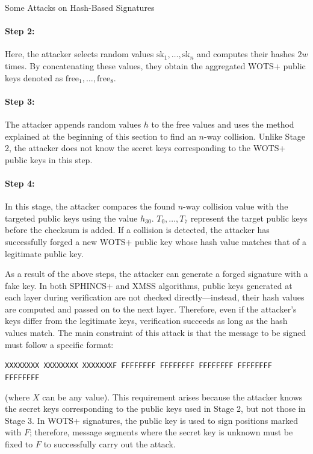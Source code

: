 \documentclass[version=preprint]{iacrcc}
\begin{document}
\begin{section}{Some Attacks on Hash-Based Signatures}
\paragraph{Step 2:}
Here, the attacker selects random values \( \text{sk}_1, \ldots, \text{sk}_n \) and computes their hashes \( 2w \) times. By concatenating these values, they obtain the aggregated WOTS+ public keys denoted as \( \text{free}_1, \ldots, \text{free}_8 \).

\paragraph{Step 3:}
The attacker appends random values \( h \) to the free values and uses the method explained at the beginning of this section to find an \( n \)-way collision. Unlike Stage 2, the attacker does not know the secret keys corresponding to the WOTS+ public keys in this step.

\paragraph{Step 4:}
In this stage, the attacker compares the found \( n \)-way collision value with the targeted public keys using the value \( h_{30} \). \( T_0, \ldots, T_7 \) represent the target public keys before the checksum is added. If a collision is detected, the attacker has successfully forged a new WOTS+ public key whose hash value matches that of a legitimate public key.

As a result of the above steps, the attacker can generate a forged signature with a fake key. In both SPHINCS+ and XMSS algorithms, public keys generated at each layer during verification are not checked directly—instead, their hash values are computed and passed on to the next layer. Therefore, even if the attacker’s keys differ from the legitimate keys, verification succeeds as long as the hash values match. The main constraint of this attack is that the message to be signed must follow a specific format:

\begin{center}
\texttt{XXXXXXXX XXXXXXXX XXXXXXXF FFFFFFFF FFFFFFFF FFFFFFFF FFFFFFFF FFFFFFFF}
\end{center}

(where \( X \) can be any value). This requirement arises because the attacker knows the secret keys corresponding to the public keys used in Stage 2, but not those in Stage 3. In WOTS+ signatures, the public key is used to sign positions marked with \( F \); therefore, message segments where the secret key is unknown must be fixed to \( F \) to successfully carry out the attack.


\end{section}
\end{document}
